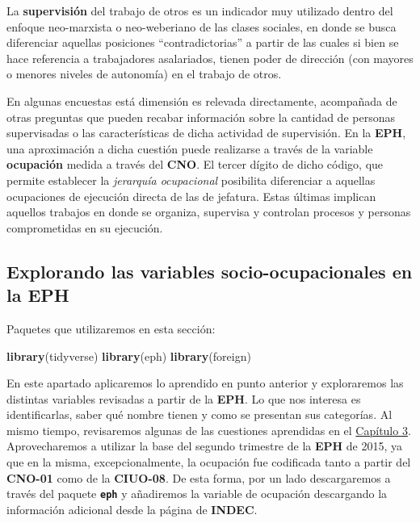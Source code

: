 \documentclass[
]{article}
\newenvironment{Shaded}{\begin{snugshade}}{\end{snugshade}}
\newcommand{\FunctionTok}[1]{\textcolor[rgb]{0.13,0.29,0.53}{\textbf{#1}}}
\newcommand{\NormalTok}[1]{#1}
\begin{document}
La \textbf{supervisión} del trabajo de otros es un indicador muy utilizado dentro del enfoque neo-marxista o neo-weberiano de las clases sociales, en donde se busca diferenciar aquellas posiciones ``contradictorias'' a partir de las cuales si bien se hace referencia a trabajadores asalariados, tienen poder de dirección (con mayores o menores niveles de autonomía) en el trabajo de otros.

En algunas encuestas está dimensión es relevada directamente, acompañada de otras preguntas que pueden recabar información sobre la cantidad de personas supervisadas o las características de dicha actividad de supervisión. En la \textbf{EPH}, una aproximación a dicha cuestión puede realizarse a través de la variable \textbf{ocupación} medida a través del \textbf{CNO}. El tercer dígito de dicho código, que permite establecer la \emph{jerarquía ocupacional} posibilita diferenciar a aquellas ocupaciones de ejecución directa de las de jefatura. Estas últimas implican aquellos trabajos en donde se organiza, supervisa y controlan procesos y personas comprometidas en su ejecución.

\hypertarget{eph4}{%
\subsection{Explorando las variables socio-ocupacionales en la EPH}\label{eph4}}

Paquetes que utilizaremos en esta sección:

\begin{Shaded}
\begin{Highlighting}[]
\FunctionTok{library}\NormalTok{(tidyverse)}
\FunctionTok{library}\NormalTok{(eph)}
\FunctionTok{library}\NormalTok{(foreign)}
\end{Highlighting}
\end{Shaded}

En este apartado aplicaremos lo aprendido en punto anterior y exploraremos las distintas variables revisadas a partir de la \textbf{EPH}. Lo que nos interesa es identificarlas, saber qué nombre tienen y como se presentan sus categorías. Al mismo tiempo, revisaremos algunas de las cuestiones aprendidas en el \protect\hyperlink{fuentes}{Capítulo 3}. Aprovecharemos a utilizar la base del segundo trimestre de la \textbf{EPH} de 2015, ya que en la misma, excepcionalmente, la ocupación fue codificada tanto a partir del \textbf{CNO-01} como de la \textbf{CIUO-08}. De esta forma, por un lado descargaremos a través del paquete \textbf{\texttt{eph}} y añadiremos la variable de ocupación descargando la información adicional desde la página de \textbf{INDEC}.
\end{document}
